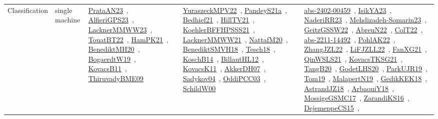 {\begin{longtable}{lp{3cm}>{\raggedright\arraybackslash}p{6cm}>{\raggedright\arraybackslash}p{6cm}>{\raggedright\arraybackslash}p{8cm}}
Classification & single machine & \href{articles/PrataAN23.pdf}{PrataAN23}~\cite{PrataAN23}, \href{articles/AlfieriGPS23.pdf}{AlfieriGPS23}~\cite{AlfieriGPS23}, \href{articles/LacknerMMWW23.pdf}{LacknerMMWW23}~\cite{LacknerMMWW23}, \href{papers/TouatBT22.pdf}{TouatBT22}~\cite{TouatBT22}, \href{articles/HamPK21.pdf}{HamPK21}~\cite{HamPK21}, \href{articles/BenediktMH20.pdf}{BenediktMH20}~\cite{BenediktMH20}, \href{papers/BogaerdtW19.pdf}{BogaerdtW19}~\cite{BogaerdtW19}, \href{articles/KovacsB11.pdf}{KovacsB11}~\cite{KovacsB11}, \href{papers/ThiruvadyBME09.pdf}{ThiruvadyBME09}~\cite{ThiruvadyBME09} & \href{articles/YuraszeckMPV22.pdf}{YuraszeckMPV22}~\cite{YuraszeckMPV22}, \href{articles/PandeyS21a.pdf}{PandeyS21a}~\cite{PandeyS21a}, \href{articles/Bedhief21.pdf}{Bedhief21}~\cite{Bedhief21}, \href{papers/HillTV21.pdf}{HillTV21}~\cite{HillTV21}, \href{articles/KoehlerBFFHPSSS21.pdf}{KoehlerBFFHPSSS21}~\cite{KoehlerBFFHPSSS21}, \href{papers/LacknerMMWW21.pdf}{LacknerMMWW21}~\cite{LacknerMMWW21}, \href{papers/NattafM20.pdf}{NattafM20}~\cite{NattafM20}, \href{papers/BenediktSMVH18.pdf}{BenediktSMVH18}~\cite{BenediktSMVH18}, \href{papers/Tesch18.pdf}{Tesch18}~\cite{Tesch18}, \href{papers/KoschB14.pdf}{KoschB14}~\cite{KoschB14}, \href{papers/BillautHL12.pdf}{BillautHL12}~\cite{BillautHL12}, \href{articles/KovacsK11.pdf}{KovacsK11}~\cite{KovacsK11}, \href{papers/AkkerDH07.pdf}{AkkerDH07}~\cite{AkkerDH07}, \href{papers/Sadykov04.pdf}{Sadykov04}~\cite{Sadykov04}, \href{papers/OddiPCC03.pdf}{OddiPCC03}~\cite{OddiPCC03}, \href{articles/SchildW00.pdf}{SchildW00}~\cite{SchildW00} & \href{articles/abs-2402-00459.pdf}{abs-2402-00459}~\cite{abs-2402-00459}, \href{articles/IsikYA23.pdf}{IsikYA23}~\cite{IsikYA23}, \href{articles/NaderiRR23.pdf}{NaderiRR23}~\cite{NaderiRR23}, \href{papers/Mehdizadeh-Somarin23.pdf}{Mehdizadeh-Somarin23}~\cite{Mehdizadeh-Somarin23}, \href{papers/GeitzGSSW22.pdf}{GeitzGSSW22}~\cite{GeitzGSSW22}, \href{articles/AbreuN22.pdf}{AbreuN22}~\cite{AbreuN22}, \href{articles/ColT22.pdf}{ColT22}~\cite{ColT22}, \href{articles/abs-2211-14492.pdf}{abs-2211-14492}~\cite{abs-2211-14492}, \href{articles/PohlAK22.pdf}{PohlAK22}~\cite{PohlAK22}, \href{papers/ZhangJZL22.pdf}{ZhangJZL22}~\cite{ZhangJZL22}, \href{papers/LiFJZLL22.pdf}{LiFJZLL22}~\cite{LiFJZLL22}, \href{articles/FanXG21.pdf}{FanXG21}~\cite{FanXG21}, \href{articles/QinWSLS21.pdf}{QinWSLS21}~\cite{QinWSLS21}, \href{papers/KovacsTKSG21.pdf}{KovacsTKSG21}~\cite{KovacsTKSG21}, \href{papers/TangB20.pdf}{TangB20}~\cite{TangB20}, \href{papers/GodetLHS20.pdf}{GodetLHS20}~\cite{GodetLHS20}, \href{papers/ParkUJR19.pdf}{ParkUJR19}~\cite{ParkUJR19}, \href{papers/Tom19.pdf}{Tom19}~\cite{Tom19}, \href{papers/MalapertN19.pdf}{MalapertN19}~\cite{MalapertN19}, \href{articles/GedikKEK18.pdf}{GedikKEK18}~\cite{GedikKEK18}, \href{papers/AstrandJZ18.pdf}{AstrandJZ18}~\cite{AstrandJZ18}, \href{papers/ArbaouiY18.pdf}{ArbaouiY18}~\cite{ArbaouiY18}, \href{papers/MossigeGSMC17.pdf}{MossigeGSMC17}~\cite{MossigeGSMC17}, \href{articles/ZarandiKS16.pdf}{ZarandiKS16}~\cite{ZarandiKS16}, \href{papers/DejemeppeCS15.pdf}{DejemeppeCS15}~\cite{DejemeppeCS15}, 
\end{longtable}}
